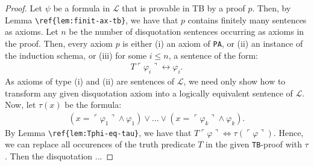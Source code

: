 \begin{proof} %
Let $\psi$ be a formula in $\mathcal{L}$ that is provable in TB by a proof $p$. Then, by Lemma \verb|\ref{lem:finit-ax-tb}|, we have that $p$ contains finitely many sentences as axioms. Let $n$ be the number of disquotation sentences occurring as axioms in the proof. Then, every axiom $p$ is either (i) an axiom of \texttt{PA}, or (ii) an instance of the induction schema, or (iii) for some $i \leq n$, a sentence of the form: 
\begin{align*}
    T\ulcorner \varphi_i \urcorner \leftrightarrow \varphi_i.
\end{align*}
As axioms of type (i) and (ii) are sentences of $\mathcal{L}$, we need only show how to transform any given disquotation axiom into a logically equivalent sentence of $\mathcal{L}$. Now, let $\tau(x)$ be the formula: 
\begin{align*}
    (x = \ulcorner \varphi_1 \urcorner \land \varphi_1) \lor ... \lor (x = \ulcorner \varphi_k \urcorner \land \varphi_k).
\end{align*}
By Lemma \verb|\ref{lem:Tphi-eq-tau}|, we have that $T\ulcorner \varphi \urcorner \iff \tau(\ulcorner \varphi \urcorner)$. Hence, we can replace all occurences of the truth predicate $T$ in the given \texttt{TB}-proof with $\tau$. Then the disquotation ...
\end{proof}
